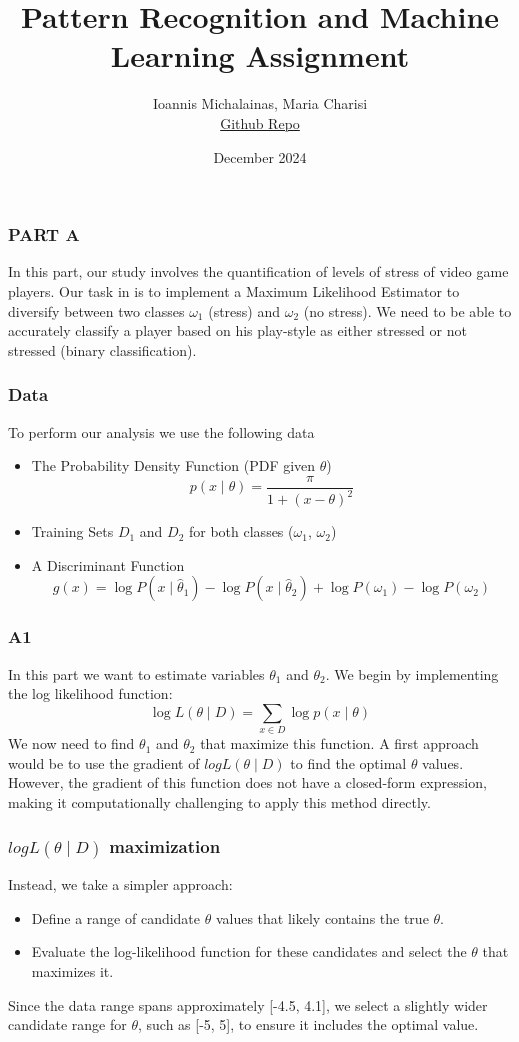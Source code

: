 \documentclass{beamer}
\title{Pattern Recognition and Machine Learning Assignment}
\author{Ioannis Michalainas, Maria Charisi \\
    \href{https://github.com/ioannisam/PR-ML}{Github Repo}
}
\date{December 2024}
\begin{document}
\frame{\titlepage}

\begin{frame}


\frametitle{PART A}
In this part, our study involves the quantification of levels of stress of video game players. Our task in is to implement a Maximum Likelihood Estimator to diversify between two classes $\omega_1$ (stress) and $\omega_2$ (no stress). We need to be able to accurately classify a player based on his play-style as either stressed or not stressed (binary classification).

\end{frame}

\begin{frame}
\frametitle{Data}

To perform our analysis we use the following data 
\begin{itemize}
    \item The Probability Density Function (PDF given $\theta$)$$ p(x \mid \theta) = \frac{\pi}{1 + (x - \theta)^2} $$
    \item Training Sets $D_1$ and $D_2$ for both classes ($\omega_1$, $\omega_2$)
    \item A Discriminant Function $$ g(x) = \log P(x \mid \hat{\theta}_1) - \log P(x \mid \hat{\theta}_2) + \log P(\omega_1) - \log P(\omega_2) $$
\end{itemize}
\end{frame}

\begin{frame}
\frametitle{A1}
In this part we want to estimate variables $\theta_1$ and $\theta_2$.
We begin by implementing the log likelihood function:
$$
\log L(\theta \mid D) = \sum_{x \in D} \log p(x \mid \theta)
$$
We now need to find $\theta_1$ and $\theta_2$ that maximize this function. A first approach would be to use the gradient of $log L(\theta \mid D)$ to find the optimal $\theta$ values. However, the gradient of this function does not have a closed-form expression, making it computationally challenging to apply this method directly.
\end{frame}

\begin{frame}
\frametitle{$log L(\theta \mid D)$ maximization}
Instead, we take a simpler approach:
\begin{itemize}
    \item Define a range of candidate $\theta$ values that likely contains the true $\theta$.
    \item Evaluate the log-likelihood function for these candidates and select the $\theta$ that maximizes it.
\end{itemize}
Since the data range spans approximately [-4.5, 4.1], we select a slightly wider candidate range for $\theta$, such as [-5, 5], to ensure it includes the optimal value.
\end{frame}
\end{document}
